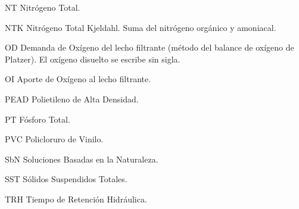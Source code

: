 \begin{glosario}
  \item[NT] Nitrógeno Total.
  \item[NTK] Nitrógeno Total Kjeldahl. Suma del nitrógeno orgánico y amoniacal.
  \item[OD] Demanda de Oxígeno del lecho filtrante (método del balance de oxígeno de Platzer). El oxígeno disuelto se escribe sin sigla.
  \item[OI] Aporte de Oxígeno al lecho filtrante.
  \item[PEAD] Polietileno de Alta Densidad.
  \item[PT] Fósforo Total.
  \item[PVC] Policloruro de Vinilo.
  \item[SbN] Soluciones Basadas en la Naturaleza.
  \item[SST] Sólidos Suspendidos Totales.
  \item[TRH] Tiempo de Retención Hidráulica.
\end{glosario}
